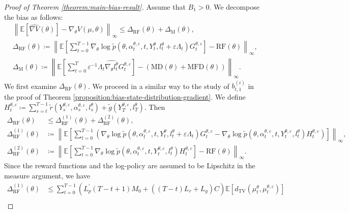 \documentclass[11pt]{article}
\numberwithin{equation}{section}
\theoremstyle{definition}
\theoremstyle{remark}
\def\eps{\varepsilon}
\def\tv{\mathrm{TV}}
\begin{document}
\begin{proof}[Proof of Theorem \ref{theorem:main-bias-result}]
Assume that $B_1 > 0$. We decompose the bias as follows:
\[
\begin{aligned}
    &\left\| \mathbb E \left[\widehat{\nabla V}(\theta) \right] - \nabla_\theta V (\mu, \theta)\right\|_\infty \leq \Delta_{\mathrm{RF}}(\theta) + \Delta_{\mathrm M}(\theta), \\
    &\Delta_{\mathrm{RF}}(\theta) \coloneq \left\|\mathbb E \left[\sum_{t=0}^{T-1} \nabla_\theta \log \tilde p(\theta, \alpha_t^{\theta, \eps},t, Y_t^\theta, l_t^\theta + \eps \Lambda_t)G_t^{\theta, \eps} \right]- \mathrm{RF}(\theta) \right\|_\infty, \\
    &\Delta_{\mathrm M}(\theta) \coloneq \left\| \mathbb E \left[\sum_{t=0}^{T} \eps^{-1} \Lambda_t \widehat{\nabla_\theta l^\theta_t} G_t^{\theta, \eps} \right]  - (\mathrm{MD}(\theta) + \mathrm{MFD}(\theta)) \right\|_\infty.
\end{aligned}
\]
We first examine $\Delta_{\mathrm{RF}}(\theta)$.
We proceed in a similar way to the study of $b_{t,1}^{(i)}$ in the proof of Theorem \ref{proposition:bias-state-distribution-gradient}. 
We define $H_t^{\theta, \eps} \coloneq \sum_{s=t}^{T-1} \tilde r(Y_s^{\theta, \eps}, \alpha_s^{\theta, \eps}, l_s^{\theta}) + \tilde g(Y_T^{\theta, \eps}, l_T^{\theta})$.
Then
\[
\begin{aligned}
    \Delta_{\mathrm{RF}}(\theta) &\leq \Delta_{\mathrm{RF}}^{(1)}(\theta) + \Delta_{\mathrm{RF}}^{(2)}(\theta), \\
    \Delta_{\mathrm{RF}}^{(1)}(\theta) &\coloneq \left\| \mathbb E \left[\sum_{t=0}^{T-1} \left(\nabla_\theta \log \tilde p(\theta, \alpha_t^{\theta, \eps}, t,Y_t^\theta, l_t^\theta + \eps \Lambda_t)G_t^{\theta, \eps} - \nabla_\theta \log \tilde p (\theta, \alpha_t^{\theta, \eps}, t,Y_t^{\theta, \eps}, l_t^\theta)H_t^{\theta, \eps} \right)\right] \right\|_\infty, \\
    \Delta_{\mathrm{RF}}^{(2)}(\theta) &\coloneq \left\| \mathbb E \left[\sum_{t=0}^{T-1} \nabla_\theta \log \tilde p (\theta, \alpha_t^{\theta, \eps},t, Y_t^{\theta, \eps}, l_t^\theta)H_t^{\theta, \eps} \right] - \mathrm{RF}(\theta) \right\|_\infty.
\end{aligned}
\]
Since the reward functions and the log-policy are assumed to be Lipschitz in the measure argument, we have
\[
\begin{aligned}
 \Delta_{\mathrm{RF}}^{(1)}(\theta) &\leq \sum_{t=0}^{T-1} \left(L_{p}^\prime (T - t + 1) M_0 + \left((T - t)L_r + L_g \right)C\right) \mathbb E \left[ d_\tv(\mu_t^\theta, \mu_t^{\theta, \eps}) \right] \\

\end{aligned}\]
\end{proof}
\end{document}
